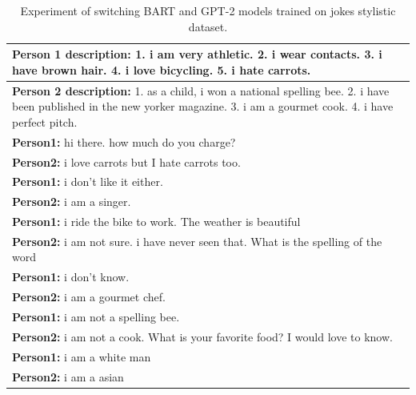 \begin{table}[ht]
\centering
 \begin{tabular}{|p{14cm}|} 
 \hline
 \textbf{Person 1 description:} 1. i am very athletic. 2. i wear contacts. 3. i have brown hair. 4. i love bicycling. 5. i hate carrots. \\
 \hline
 \textbf{Person 2 description:} 1. as a child, i won a national spelling bee. 2. i have been published in the new yorker magazine. 3. i am a gourmet cook. 4. i have perfect pitch. \\
 \hline
 \textbf{Person1:} hi there. how much do you charge?  \\
 \textbf{Person2:} i love carrots but I hate carrots too.  \\ 
 \textbf{Person1:} i don't like it either. \\
 \textbf{Person2:} i am a singer.\\
 \textbf{Person1:} i ride the bike to work. The weather is beautiful  \\
 \textbf{Person2:} i am not sure. i have never seen that. What is the spelling of the word   \\
 \textbf{Person1:} i don't know. \\
 \textbf{Person2:} i am a gourmet chef. \\
 \textbf{Person1:} i am not a spelling bee. \\
 \textbf{Person2:} i am not a cook. What is your favorite food? I would love to know. \\
 \textbf{Person1:} i am a white man \\
 \textbf{Person2:} i am a asian \\
 \hline
 \end{tabular}
 \caption{Experiment of switching BART and GPT-2 models trained on jokes stylistic dataset.}
\label{tab:jokes_switch}
\end{table}

